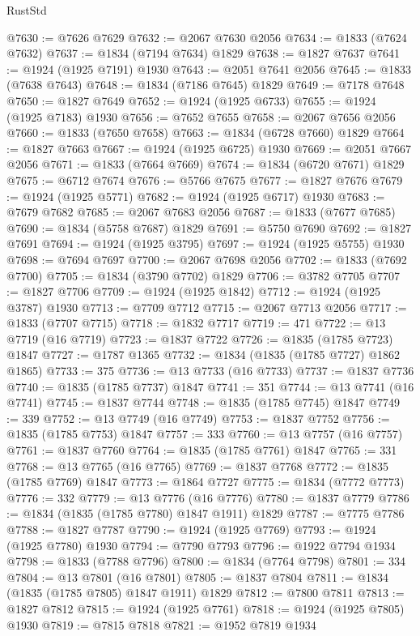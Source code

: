 \begin{lexlean}{RustStd}
\begin{coremodule}
@7630 := @7626 @7629
@7632 := @2067 @7630 @2056
@7634 := @1833 (@7624 @7632)
@7637 := @1834 (@7194 @7634) @1829
@7638 := @1827 @7637
@7641 := @1924 (@1925 @7191) @1930
@7643 := @2051 @7641 @2056
@7645 := @1833 (@7638 @7643)
@7648 := @1834 (@7186 @7645) @1829
@7649 := @7178 @7648
@7650 := @1827 @7649
@7652 := @1924 (@1925 @6733)
@7655 := @1924 (@1925 @7183) @1930
@7656 := @7652 @7655
@7658 := @2067 @7656 @2056
@7660 := @1833 (@7650 @7658)
@7663 := @1834 (@6728 @7660) @1829
@7664 := @1827 @7663
@7667 := @1924 (@1925 @6725) @1930
@7669 := @2051 @7667 @2056
@7671 := @1833 (@7664 @7669)
@7674 := @1834 (@6720 @7671) @1829
@7675 := @6712 @7674
@7676 := @5766 @7675
@7677 := @1827 @7676
@7679 := @1924 (@1925 @5771)
@7682 := @1924 (@1925 @6717) @1930
@7683 := @7679 @7682
@7685 := @2067 @7683 @2056
@7687 := @1833 (@7677 @7685)
@7690 := @1834 (@5758 @7687) @1829
@7691 := @5750 @7690
@7692 := @1827 @7691
@7694 := @1924 (@1925 @3795)
@7697 := @1924 (@1925 @5755) @1930
@7698 := @7694 @7697
@7700 := @2067 @7698 @2056
@7702 := @1833 (@7692 @7700)
@7705 := @1834 (@3790 @7702) @1829
@7706 := @3782 @7705
@7707 := @1827 @7706
@7709 := @1924 (@1925 @1842)
@7712 := @1924 (@1925 @3787) @1930
@7713 := @7709 @7712
@7715 := @2067 @7713 @2056
@7717 := @1833 (@7707 @7715)
@7718 := @1832 @7717
@7719 := 471
@7722 := @13 @7719 (@16 @7719)
@7723 := @1837 @7722
@7726 := @1835 (@1785 @7723) @1847
@7727 := @1787 @1365
@7732 := @1834 (@1835 (@1785 @7727) @1862 @1865)
@7733 := 375
@7736 := @13 @7733 (@16 @7733)
@7737 := @1837 @7736
@7740 := @1835 (@1785 @7737) @1847
@7741 := 351
@7744 := @13 @7741 (@16 @7741)
@7745 := @1837 @7744
@7748 := @1835 (@1785 @7745) @1847
@7749 := 339
@7752 := @13 @7749 (@16 @7749)
@7753 := @1837 @7752
@7756 := @1835 (@1785 @7753) @1847
@7757 := 333
@7760 := @13 @7757 (@16 @7757)
@7761 := @1837 @7760
@7764 := @1835 (@1785 @7761) @1847
@7765 := 331
@7768 := @13 @7765 (@16 @7765)
@7769 := @1837 @7768
@7772 := @1835 (@1785 @7769) @1847
@7773 := @1864 @7727
@7775 := @1834 (@7772 @7773)
@7776 := 332
@7779 := @13 @7776 (@16 @7776)
@7780 := @1837 @7779
@7786 := @1834 (@1835 (@1785 @7780) @1847 @1911) @1829
@7787 := @7775 @7786
@7788 := @1827 @7787
@7790 := @1924 (@1925 @7769)
@7793 := @1924 (@1925 @7780) @1930
@7794 := @7790 @7793
@7796 := @1922 @7794 @1934
@7798 := @1833 (@7788 @7796)
@7800 := @1834 (@7764 @7798)
@7801 := 334
@7804 := @13 @7801 (@16 @7801)
@7805 := @1837 @7804
@7811 := @1834 (@1835 (@1785 @7805) @1847 @1911) @1829
@7812 := @7800 @7811
@7813 := @1827 @7812
@7815 := @1924 (@1925 @7761)
@7818 := @1924 (@1925 @7805) @1930
@7819 := @7815 @7818
@7821 := @1952 @7819 @1934

\end{coremodule}
\end{lexlean}
